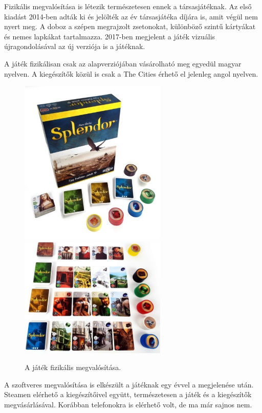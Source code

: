 
Fizikális megvalósítása is létezik természetesen ennek a társasjátéknak. Az első kiadást 2014-ben adták ki és jelölték az év társasjátéka díjára is, amit végül nem nyert meg. A doboz a szépen megrajzolt zsetonokat, különböző szintű kártyákat és nemes lapkákat tartalmazza. 2017-ben megjelent a játék vizuális újragondolásával az új verziója is a játéknak.\par

A játék fizikálisan csak az alapverziójában vásárolható meg egyedül magyar nyelven. A kiegészítők közül is csak a The Cities érhető el jelenleg angol nyelven.

\begin{figure}[h]
\centering
\includegraphics[width=7cm]{images/physical_edition1.jpg}
\hspace{1cm}
\includegraphics[width=7cm]{images/physical_edition2.jpg}
\caption{A játék fizikális megvalósítása.}
\label{fig:physical}
\end{figure}


A szoftveres megvalósítása is elkészült a játéknak egy évvel a megjelenése után. Steamen elérhető a kiegészítőivel együtt, természetesen a játék és a kiegészítők megvásárlásával. Korábban telefonokra is elérhető volt, de ma már sajnos nem.

